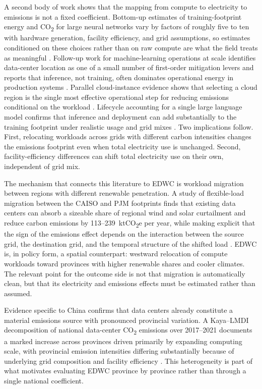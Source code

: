 \documentclass[12pt,a4paper]{article}
\begin{document}
A second body of work shows that the mapping from compute to
electricity to emissions is not a fixed coefficient. Bottom-up
estimates of training-footprint energy and CO\textsubscript{2} for
large neural networks vary by factors of roughly five to ten with
hardware generation, facility efficiency, and grid assumptions, so
estimates conditioned on these choices rather than on raw compute are
what the field treats as meaningful
\citep{pattersonetal-2021-carbonemissionslarge}. Follow-up work for
machine-learning operations at scale identifies data-center location
as one of a small number of first-order mitigation levers and reports
that inference, not training, often dominates operational energy in
production systems \citep{pattersonetal-2022-carbonfootprintmachine}.
Parallel cloud-instance evidence shows that selecting a cloud region
is the single most effective operational step for reducing emissions
conditional on the workload
\citep{dodgeetal-2022-measuringcarbonintensity}. Lifecycle accounting
for a single large language model confirms that inference and
deployment can add substantially to the training footprint under
realistic usage and grid mixes
\citep{luccionietal-2023-estimatingcarbonfootprint}. Two implications
follow. First, relocating workloads across grids with different
carbon intensities changes the emissions footprint even when total
electricity use is unchanged. Second, facility-efficiency differences
can shift total electricity use on their own, independent of grid
mix.

The mechanism that connects this literature to EDWC is workload
migration between regions with different renewable penetration. A
study of flexible-load migration between the CAISO and PJM footprints
finds that existing data centers can absorb a sizeable share of
regional wind and solar curtailment and reduce carbon emissions by
113--239~ktCO\textsubscript{2}e per year, while making explicit that
the sign of the emissions effect depends on the interaction between
the source grid, the destination grid, and the temporal structure of
the shifted load \citep{zhengetal-2020-mitigatingcurtailmentcarbon}.
EDWC is, in policy form, a spatial counterpart: westward relocation
of compute workloads toward provinces with higher renewable shares
and cooler climates. The relevant point for the outcome side is not
that migration is automatically clean, but that its electricity and
emissions effects must be estimated rather than assumed.

Evidence specific to China confirms that data centers already
constitute a material emissions source with pronounced provincial
variation. A Kaya--LMDI decomposition of national data-center
CO\textsubscript{2} emissions over 2017--2021 documents a marked
increase across provinces driven primarily by expanding computing
scale, with provincial emission intensities differing substantially
because of underlying grid composition and facility efficiency
\citep{nietal-2024-co2emissionmitigationpathways}. This heterogeneity
is part of what motivates evaluating EDWC province by province
rather than through a single national coefficient.
\end{document}
